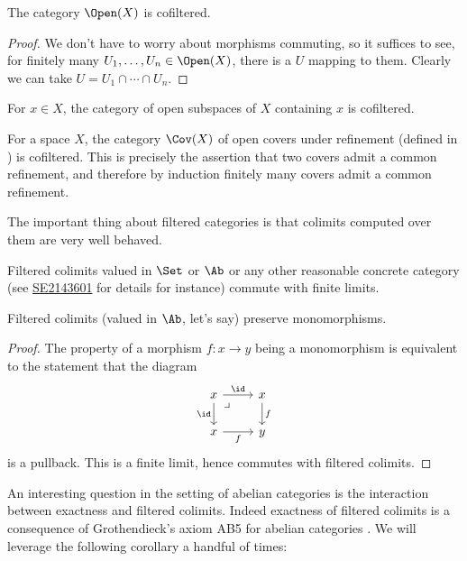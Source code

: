 \documentclass[11pt]{book}
\begin{document}
\begin{example}\label{exa:OpenX-filtered} The category $\Open(X)$ is cofiltered.
\end{example}
\begin{proof} We don't have to worry about morphisms commuting, so it suffices to see, for finitely many $U_1, \ldots, U_n\in \Open(X)$, there is a $U$ mapping to them. Clearly we can take $U = U_1\cap \cdots \cap U_n$.
\end{proof}
\begin{example}\label{exa:OpenX-containing-x-filtered} For $x\in X$, the category of open subspaces of $X$ containing $x$ is cofiltered.
\end{example}


\begin{example}\label{exa:CovX-filtered} For a space $X$, the category $\Cov(X)$ of open covers under refinement (defined in ) is cofiltered. This is precisely the assertion that two covers admit a common refinement, and therefore by induction finitely many covers admit a common refinement.
\end{example}

The important thing about filtered categories is that colimits computed over them are very well behaved.

\begin{proposition} Filtered colimits valued in $\Set$ or $\Ab$ or any other reasonable concrete category (see \href{https://math.stackexchange.com/a/2143601}{SE2143601} for details for instance) commute with finite limits.
\end{proposition}

\begin{corollary} Filtered colimits (valued in $\Ab$, let's say) preserve monomorphisms.
\end{corollary}
\begin{proof} The property of a morphism $f \colon x \to y$ being a monomorphism is equivalent to the statement that the diagram
\[ \begin{tikzcd}
    x\rar["\id"]\dar["\id" left]\pb & x\dar["f" right]\\
    x\rar["f" below] & y
\end{tikzcd} \]
is a pullback. This is a finite limit, hence commutes with filtered colimits.
\end{proof}

An interesting question in the setting of abelian categories is the interaction between exactness and filtered colimits. Indeed exactness of filtered colimits is a consequence of Grothendieck's axiom AB5 for abelian categories \cite[1.8.1]{Tohoku}. We will leverage the following corollary a handful of times:
\end{document}
